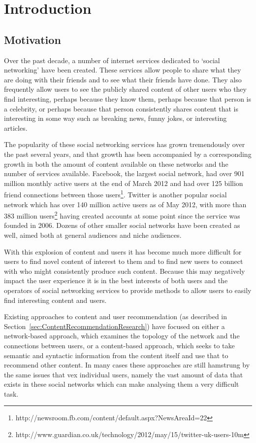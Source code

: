 \chapter{Introduction}

\section{Motivation}

Over the past decade, a number of internet services dedicated to `social networking' have been created. These services allow people to share what they are doing with their friends and to see what their friends have done. They also frequently allow users to see the publicly shared content of other users who they find interesting, perhaps because they know them, perhaps because that person is a celebrity, or perhaps because that person consistently shares content that is interesting in some way such as breaking news, funny jokes, or interesting articles.

The popularity of these social networking services has grown tremendously over the past several years, and that growth has been accompanied by a corresponding growth in both the amount of content available on these networks and the number of services available. Facebook, the largest social network, had over 901 million monthly active users at the end of March 2012 and had over 125 billion friend connections between those users\footnote{http://newsroom.fb.com/content/default.aspx?NewsAreaId=22}. Twitter is another popular social network which has over 140 million active users as of May 2012, with more than 383 million users\footnote{http://www.guardian.co.uk/technology/2012/may/15/twitter-uk-users-10m} having created accounts at some point since the service was founded in 2006. Dozens of other smaller social networks have been created as well, aimed both at general audiences and niche audiences.

With this explosion of content and users it has become much more difficult for users to find novel content of interest to them and to find new users to connect with who might consistently produce such content. Because this may negatively impact the user experience it is in the best interests of both users and the operators of social networking services to provide methods to allow users to easily find interesting content and users.

Existing approaches to content and user recommendation (as described in Section~\ref{sec:ContentRecommendationResearch}) have focused on either a network-based approach, which examines the topology of the network and the connections between users, or a content-based approach, which seeks to take semantic and syntactic information from the content itself and use that to recommend other content. In many cases these approaches are still hamstrung by the same issues that vex individual users, namely the vast amount of data that exists in these social networks which can make analysing them a very difficult task.

